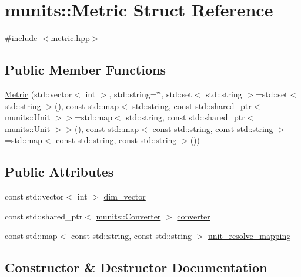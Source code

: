 \hypertarget{structmunits_1_1_metric}{}\section{munits\+:\+:Metric Struct Reference}
\label{structmunits_1_1_metric}


{\ttfamily \#include $<$metric.\+hpp$>$}

\subsection*{Public Member Functions}
\begin{DoxyCompactItemize}
\item 
\hyperlink{structmunits_1_1_metric_a365db074d677d69008f3aa919faf2a09}{Metric} (std\+::vector$<$ int $>$, std\+::string=\char`\"{}\char`\"{}, std\+::set$<$ std\+::string $>$=std\+::set$<$ std\+::string $>$(), const std\+::map$<$ std\+::string, const std\+::shared\+\_\+ptr$<$ \hyperlink{classmunits_1_1_unit}{munits\+::\+Unit} $>$$>$=std\+::map$<$ std\+::string, const std\+::shared\+\_\+ptr$<$ \hyperlink{classmunits_1_1_unit}{munits\+::\+Unit} $>$$>$(), const std\+::map$<$ const std\+::string, const std\+::string $>$=std\+::map$<$ const std\+::string, const std\+::string $>$())
\end{DoxyCompactItemize}
\subsection*{Public Attributes}
\begin{DoxyCompactItemize}
\item 
const std\+::vector$<$ int $>$ \hyperlink{structmunits_1_1_metric_a4beffad44091db5d1173075b5130266d}{dim\+\_\+vector}
\item 
const std\+::shared\+\_\+ptr$<$ \hyperlink{classmunits_1_1_converter}{munits\+::\+Converter} $>$ \hyperlink{structmunits_1_1_metric_aa51faca2f90c8bc80a8c5144a1ce15a0}{converter}
\item 
const std\+::map$<$ const std\+::string, const std\+::string $>$ \hyperlink{structmunits_1_1_metric_aa44951fa72f8ba14225164eb518ea9ac}{unit\+\_\+resolve\+\_\+mapping}
\end{DoxyCompactItemize}


\subsection{Constructor \& Destructor Documentation}
\mbox{\label{structmunits_1_1_metric_a365db074d677d69008f3aa919faf2a09}} 
